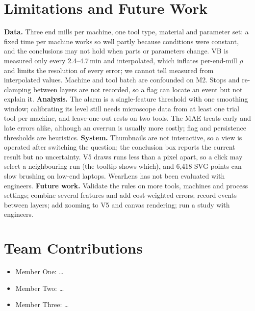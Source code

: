 \documentclass{vgtc}                          %
\begin{document}
\section{Limitations and Future Work}
\label{sec:limitations}
\textbf{Data.} Three end mills per machine, one tool type, material and parameter set: a fixed time per machine works so
well partly because conditions were constant, and the conclusions may not hold when parts or parameters change. VB is
measured only every 2.4--4.7\,min and interpolated, which inflates per-end-mill $\rho$ and limits the resolution of every
error; we cannot tell measured from interpolated values. Machine and tool batch are confounded on M2. Stops and
re-clamping between layers are not recorded, so a flag can locate an event but not explain it.
\textbf{Analysis.} The alarm is a single-feature threshold with one smoothing window; calibrating its level still needs
microscope data from at least one trial tool per machine, and leave-one-out rests on two tools. The MAE treats early and
late errors alike, although an overrun is usually more costly; flag and persistence thresholds are heuristics.
\textbf{System.} Thumbnails are not interactive, so a view is operated after switching the question; the conclusion box
reports the current result but no uncertainty. V5 draws runs less than a pixel apart, so a click may select a neighbouring
run (the tooltip shows which), and 6,418 SVG points can slow brushing on low-end laptops. WearLens has not been evaluated
with engineers.
\textbf{Future work.} Validate the rules on more tools, machines and process settings; combine several features and add
cost-weighted errors; record events between layers; add zooming to V5 and canvas rendering; run a study with engineers.

\section{Team Contributions}
\label{sec:contributions}
\begin{itemize}
  \item Member One: \ldots
  \item Member Two: \ldots
  \item Member Three: \ldots
\end{itemize}



\end{document}
